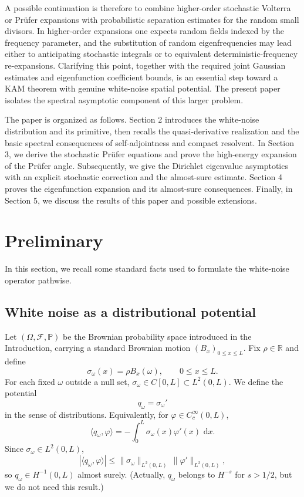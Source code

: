 \documentclass[11pt]{article}
\newcommand{\dd}{\,\mathrm d}
\newcommand{\Prob}{\mathbb P}
\newcommand{\R}{\mathbb R}
\begin{document}
A possible continuation is therefore to combine higher-order stochastic Volterra or Pr\"ufer expansions with probabilistic separation estimates for the random small divisors. In higher-order expansions one expects random fields indexed by the frequency parameter, and the substitution of random eigenfrequencies may lead either to anticipating stochastic integrals or to equivalent deterministic-frequency re-expansions. Clarifying this point, together with the required joint Gaussian estimates and eigenfunction coefficient bounds, is an essential step toward a KAM theorem with genuine white-noise spatial potential. The present paper isolates the spectral asymptotic component of this larger problem.



The paper is organized as follows. Section 2 introduces the white-noise distribution and its primitive, then recalls the quasi-derivative realization and the basic spectral consequences of self-adjointness and compact resolvent. In Section 3, we derive the stochastic Pr\"ufer equations and prove the high-energy expansion of the Pr\"ufer angle. Subsequently, we give the Dirichlet eigenvalue asymptotics with an explicit stochastic correction and the almost-sure estimate. Section 4 proves the eigenfunction expansion and its almost-sure consequences. Finally, in Section 5, we discuss the results of this paper and possible extensions.


\section{Preliminary}
In this section, we recall some standard facts used to formulate the white-noise operator pathwise.

\subsection{White noise as a distributional potential}

Let $(\Omega,\mathcal F,\Prob)$ be the Brownian probability space introduced in the Introduction, carrying a standard Brownian motion $(B_x)_{0\le x\le L}$. Fix $\rho\in\R$ and define
\[
    \sigma_\omega(x)=\rho B_x(\omega),\qquad 0\le x\le L.
\]
For each fixed $\omega$ outside a null set, $\sigma_\omega\in C[0,L]\subset L^2(0,L)$. We define the potential
\[
    q_\omega=\sigma_\omega'
\]
in the sense of distributions. Equivalently, for $\varphi\in C_c^\infty(0,L)$,
\[
    \langle q_\omega,\varphi\rangle
    =-\int_0^L \sigma_\omega(x)\varphi'(x)\,\dd x.
\]
Since $\sigma_\omega\in L^2(0,L)$,
\[
    |\langle q_\omega,\varphi\rangle|
    \le \|\sigma_\omega\|_{L^2(0,L)}\,\|\varphi'\|_{L^2(0,L)},
\]
so $q_\omega\in H^{-1}(0,L)$ almost surely. (Actually, $q_\omega$ belongs to $H^{-s}$ for $s>1/2$, but we do not need this result.)
\end{document}
